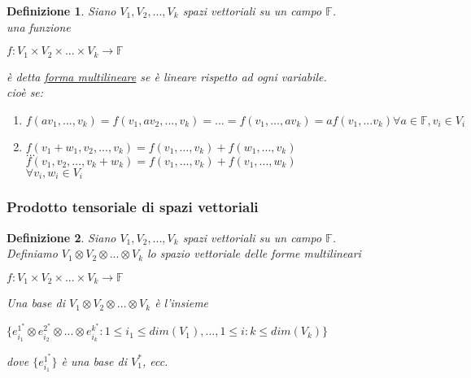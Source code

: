 \documentclass[a4paper,12pt]{article}
\theoremstyle{def}
\newtheorem*{definition}{Definizione}
\theoremstyle{prop}
\theoremstyle{esempio}
\theoremstyle{dimostrazione}
\theoremstyle{teo}
\theoremstyle{osservazione}
\begin{document}
\newpage

\begin{definition}
	Siano \(V_1, V_2, ..., V_k\) spazi vettoriali su un campo \(\mathbb{F}\).\\
	una funzione
	\begin{center}
		\(f : V_1 \times V_2 \times ... \times V_k \rightarrow \mathbb{F}\)
	\end{center}
	è detta \underline{forma multilineare} se è lineare rispetto ad ogni variabile.\\
	cioè se:
	\begin{enumerate}
		\item \(f(av_1, ... ,v_k) = f(v_1, a v_2, ..., v_k) = ... = f(v_1, ..., a v_k) = a f(v_1, ... v_k) \forall a \in \mathbb{F}, v_i \in V_i\)
		\item \(f(v_1 + w_1, v_2, ... ,v_k) = f(v_1, ..., v_k) + f(w_1, ..., v_k)\)\\
		      \(...\)\\
		      \(f(v_1, v_2, ... ,v_k + w_k) = f(v_1, ..., v_k) + f(v_1, ..., w_k)\)\\
		      \(\forall v_i, w_i \in V_i\)
	\end{enumerate}
\end{definition}

\subsubsection{Prodotto tensoriale di spazi vettoriali}
\begin{definition}
	Siano \(V_1, V_2, ..., V_k\) spazi vettoriali su un campo \(\mathbb{F}\).\\
	Definiamo \(V_1 \otimes V_2 \otimes ... \otimes V_k\)  lo spazio vettoriale delle forme multilineari\\
	\begin{center}
		\(f : V_1 \times V_2 \times ... \times V_k \rightarrow \mathbb{F}\)
	\end{center}
	Una base di \(V_1 \otimes V_2 \otimes ... \otimes V_k\) è l'insieme 
	\begin{center}
		\(\{e_{i_1}^{1^*} \otimes e_{i_2}^{2^*} \otimes ... \otimes e_{i_k}^{k^*} : 1 \leq i_1 \leq dim(V_1), ... , 1 \leq i:k \leq dim(V_k)\}\)
	\end{center}
	dove \(\{e_{i_1}^{1^*}\}\) è una base di \(V_1^*\), ecc.\\
\end{definition}

\newpage
\end{document}
